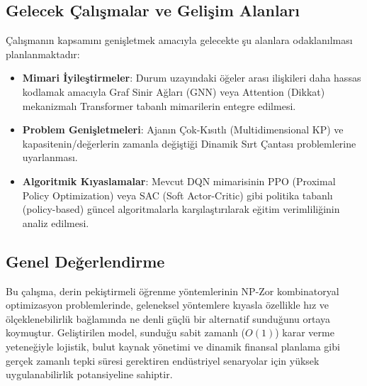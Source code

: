 \documentclass[conference]{IEEEtran}
\begin{document}
\subsection{Gelecek Çalışmalar ve Gelişim Alanları}
Çalışmanın kapsamını genişletmek amacıyla gelecekte şu alanlara odaklanılması planlanmaktadır:
\begin{itemize}
    \item \textbf{Mimari İyileştirmeler}: Durum uzayındaki öğeler arası ilişkileri daha hassas kodlamak amacıyla Graf Sinir Ağları (GNN) veya Attention (Dikkat) mekanizmalı Transformer tabanlı mimarilerin entegre edilmesi.
    \item \textbf{Problem Genişletmeleri}: Ajanın Çok-Kısıtlı (Multidimensional KP) ve kapasitenin/değerlerin zamanla değiştiği Dinamik Sırt Çantası problemlerine uyarlanması.
    \item \textbf{Algoritmik Kıyaslamalar}: Mevcut DQN mimarisinin PPO (Proximal Policy Optimization) veya SAC (Soft Actor-Critic) gibi politika tabanlı (policy-based) güncel algoritmalarla karşılaştırılarak eğitim verimliliğinin analiz edilmesi.
\end{itemize}

\subsection{Genel Değerlendirme}
Bu çalışma, derin pekiştirmeli öğrenme yöntemlerinin NP-Zor kombinatoryal optimizasyon problemlerinde, geleneksel yöntemlere kıyasla özellikle hız ve ölçeklenebilirlik bağlamında ne denli güçlü bir alternatif sunduğunu ortaya koymuştur. Geliştirilen model, sunduğu sabit zamanlı ($O(1)$) karar verme yeteneğiyle lojistik, bulut kaynak yönetimi ve dinamik finansal planlama gibi gerçek zamanlı tepki süresi gerektiren endüstriyel senaryolar için yüksek uygulanabilirlik potansiyeline sahiptir.
\end{document}
